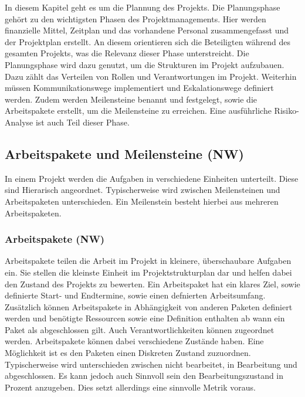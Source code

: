\documentclass[ThesisDJ.tex]{subfiles}
\begin{document}
In diesem Kapitel geht es um die Plannung des Projekts. Die Planungsphase gehört zu den wichtigsten Phasen des Projektmanagements. Hier werden finanzielle Mittel, Zeitplan und das vorhandene Personal zusammengefasst und der Projektplan erstellt. An diesem orientieren sich die Beteiligten während des gesamten Projekts, was die Relevanz dieser Phase unterstreicht. Die Planungsphase wird dazu genutzt, um die Strukturen im Projekt aufzubauen. Dazu zählt das Verteilen von Rollen und Verantwortungen im Projekt. Weiterhin müssen Kommunikationswege implementiert und Eskalationswege definiert werden. 
Zudem werden Meilensteine benannt und festgelegt, sowie die Arbeitspakete erstellt, um die Meilensteine zu erreichen. Eine ausführliche Risiko-Analyse ist auch Teil dieser Phase. 

\subsection{Arbeitspakete und Meilensteine (NW)}
In einem Projekt werden die Aufgaben in verschiedene Einheiten unterteilt. Diese sind Hierarisch angeordnet. Typischerweise wird zwischen Meilensteinen und Arbeitspaketen unterschieden.
Ein Meilenstein besteht hierbei aus mehreren Arbeitspaketen.

\subsubsection{Arbeitspakete (NW)}
Arbeitspakete teilen die Arbeit im Projekt in kleinere, überschaubare Aufgaben ein. Sie stellen die kleinste Einheit im
Projektstrukturplan dar und helfen dabei den Zustand des Projekts zu bewerten.
Ein Arbeitspaket hat ein klares Ziel, sowie definierte Start- und Endtermine, sowie einen defnierten Arbeitsumfang. 
Zusätzlich können Arbeitspakete in Abhängigkeit von anderen Paketen definiert werden und benötigte Ressourcen sowie 
eine Definition enthalten ab wann ein Paket als abgeschlossen gilt. Auch Verantwortlichkeiten können zugeordnet werden. 
Arbeitspakete können dabei verschiedene Zustände haben. Eine Möglichkeit ist es den Paketen einen Diskreten Zustand 
zuzuordnen. Typischerweise wird unterschieden zwischen nicht bearbeitet, in Bearbeitung und abgeschlossen. Es kann jedoch auch 
Sinnvoll sein den Bearbeitungszustand in Prozent anzugeben. Dies setzt allerdings eine sinnvolle Metrik voraus. 
\end{document}
